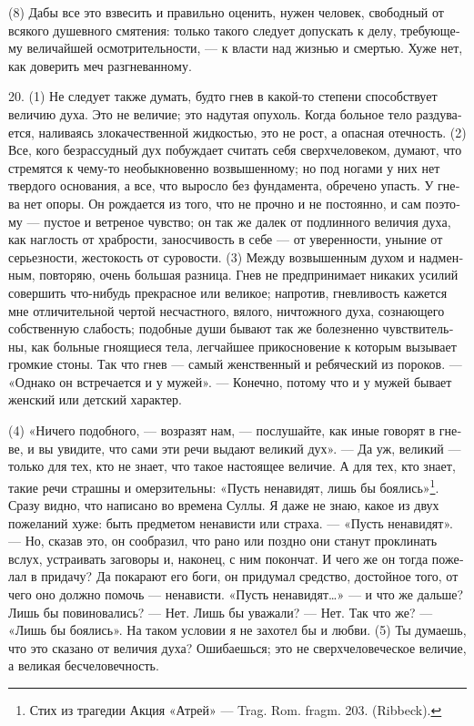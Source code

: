 (8) Дабы все это взве­сить и пра­виль­но оце­нить, нужен чело­век, сво­бод­ный от вся­ко­го душев­но­го смя­те­ния: толь­ко тако­го сле­ду­ет допус­кать к делу, тре­бу­ю­ще­му вели­чай­шей осмот­ри­тель­но­сти, --- к вла­сти над жиз­нью и смер­тью. Хуже нет, как дове­рить меч раз­гне­ван­но­му.

20. (1) Не сле­ду­ет так­же думать, буд­то гнев в какой-то сте­пе­ни спо­соб­ст­ву­ет вели­чию духа. Это не вели­чие; это наду­тая опу­холь. Когда боль­ное тело разду­ва­ет­ся, нали­ва­ясь зло­ка­че­ст­вен­ной жид­ко­стью, это не рост, а опас­ная отеч­ность. (2) Все, кого без­рас­суд­ный дух побуж­да­ет счи­тать себя сверх­че­ло­ве­ком, дума­ют, что стре­мят­ся к чему-то необык­но­вен­но воз­вы­шен­но­му; но под нога­ми у них нет твер­до­го осно­ва­ния, а все, что вырос­ло без фун­да­мен­та, обре­че­но упасть. У гне­ва нет опо­ры. Он рож­да­ет­ся из того, что не проч­но и не посто­ян­но, и сам поэто­му --- пустое и вет­ре­ное чув­ство; он так же далек от под­лин­но­го вели­чия духа, как наг­лость от храб­ро­сти, занос­чи­вость в себе --- от уве­рен­но­сти, уны­ние от серь­ез­но­сти, жесто­кость от суро­во­сти. (3) Меж­ду воз­вы­шен­ным духом и над­мен­ным, повто­ряю, очень боль­шая раз­ни­ца. Гнев не пред­при­ни­ма­ет ника­ких уси­лий совер­шить что-нибудь пре­крас­ное или вели­кое; напро­тив, гнев­ли­вость кажет­ся мне отли­чи­тель­ной чер­той несчаст­но­го, вяло­го, ничтож­но­го духа, сознаю­ще­го соб­ст­вен­ную сла­бость; подоб­ные души быва­ют так же болез­нен­но чув­ст­ви­тель­ны, как боль­ные гно­я­щи­е­ся тела, лег­чай­шее при­кос­но­ве­ние к кото­рым вызы­ва­ет гром­кие сто­ны. Так что гнев --- самый жен­ст­вен­ный и ребя­че­ский из поро­ков. --- «Одна­ко он встре­ча­ет­ся и у мужей». --- Конеч­но, пото­му что и у мужей быва­ет жен­ский или дет­ский харак­тер.

(4) «Ниче­го подоб­но­го, --- воз­ра­зят нам, --- послу­шай­те, как иные гово­рят в гне­ве, и вы увиди­те, что сами эти речи выда­ют вели­кий дух». --- Да уж, вели­кий --- толь­ко для тех, кто не зна­ет, что такое насто­я­щее вели­чие. А для тех, кто зна­ет, такие речи страш­ны и омер­зи­тель­ны: «Пусть нена­видят, лишь бы боялись»\footnote{Стих из тра­гедии Акция «Атрей» --- Trag. Rom. fragm. 203. (Ribbeck).}. Сра­зу вид­но, что напи­са­но во вре­ме­на Сул­лы. Я даже не знаю, какое из двух поже­ла­ний хуже: быть пред­ме­том нена­ви­сти или стра­ха. --- «Пусть нена­видят». --- Но, ска­зав это, он сооб­ра­зил, что рано или позд­но они ста­нут про­кли­нать вслух, устра­и­вать заго­во­ры и, нако­нец, с ним покон­чат. И чего же он тогда поже­лал в при­да­чу? Да пока­ра­ют его боги, он при­ду­мал сред­ство, достой­ное того, от чего оно долж­но помочь --- нена­ви­сти. «Пусть нена­видят…» --- и что же даль­ше? Лишь бы пови­но­ва­лись? --- Нет. Лишь бы ува­жа­ли? --- Нет. Так что же? --- «Лишь бы боя­лись». На таком усло­вии я не захо­тел бы и люб­ви. (5) Ты дума­ешь, что это ска­за­но от вели­чия духа? Оши­ба­ешь­ся; это не сверх­че­ло­ве­че­ское вели­чие, а вели­кая бес­че­ло­веч­ность.

